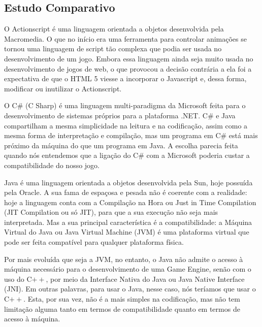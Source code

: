 \documentclass[a4paper,12pt]{report}
\begin{document}
\subsection{Estudo Comparativo}
%
O Actionscript é uma linguagem orientada a objetos desenvolvida pela Macromedia. O que no início era uma ferramenta para controlar animações 
se tornou uma linguagem de script tão complexa que podia ser usada no desenvolvimento de um jogo. Embora essa linguagem ainda seja muito usada 
no desenvolvimento de jogos de web, o que provocou a decisão contrária a ela foi a expectativa de que o HTML 5 viesse a incorporar o Javascript e, 
dessa forma, modificar ou inutilizar o Actionscript.
\par
O C\# (C Sharp) é uma linguagem multi-paradigma da Microsoft feita para o desenvolvimento de sistemas próprios para a plataforma .NET. C\# e Java 
compartilham a mesma simplicidade na leitura e na codificação, assim como a mesma forma de interpretação e compilação, mas um programa em C\# está 
mais próximo da máquina do que um programa em Java. A escolha parecia feita quando nós entendemos que a ligação do C\# com a Microsoft poderia 
custar a compatibilidade do nosso jogo.
\par
Java é uma linguagem orientada a objetos desenvolvida pela Sun, hoje possuída pela Oracle. A sua fama de espaçosa e pesada não é coerente com a 
realidade: hoje a linguagem conta com a Compilação na Hora ou Just in Time Compilation (JIT Compilation ou só JIT), 
para que a sua execução não seja mais interpretada. Mas a sua principal característica é a compatibilidade: a Máquina Virtual do Java ou Java Virtual Machine (JVM) é uma plataforma virtual que pode ser feita compatível para qualquer plataforma física.
\par
Por mais evoluída que seja a JVM, no entanto, o Java não admite o acesso à máquina necessário para o desenvolvimento de uma Game Engine, 
senão com o uso do C$++$, por meio da Interface Nativa do Java ou Java Native Interface (JNI). Em outras palavras, para usar o Java, nesse caso, 
nós teríamos que usar o C$++$. Esta, por sua vez, não é a mais simples na codificação, mas não tem limitação alguma tanto em termos de 
compatibilidade quanto em termos de acesso à máquina.
%
\end{document}
